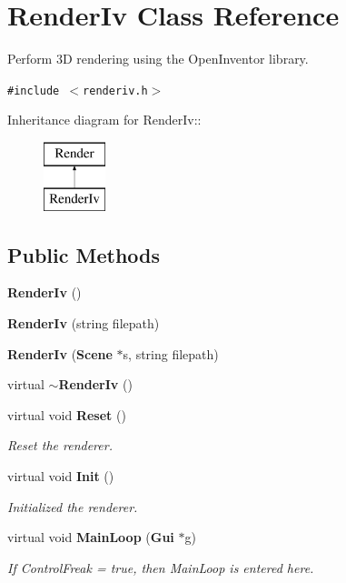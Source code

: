 \section{Render\-Iv  Class Reference}
\label{classRenderIv}
Perform 3D rendering using the Open\-Inventor library. 


{\tt \#include $<$renderiv.h$>$}

Inheritance diagram for Render\-Iv::\begin{figure}[H]
\begin{center}
\leavevmode
\includegraphics[height=2cm]{classRenderIv}
\end{center}
\end{figure}
\subsection*{Public Methods}
\begin{CompactItemize}
\item 
{\bf Render\-Iv} ()
\item 
{\bf Render\-Iv} (string filepath)
\item 
{\bf Render\-Iv} ({\bf Scene} $\ast$s, string filepath)
\item 
virtual {\bf $\sim$Render\-Iv} ()
\item 
virtual void {\bf Reset} ()
\begin{CompactList}\small\item\em Reset the renderer.\item\end{CompactList}\item 
virtual void {\bf Init} ()
\begin{CompactList}\small\item\em Initialized the renderer.\item\end{CompactList}\item 
virtual void {\bf Main\-Loop} ({\bf Gui} $\ast$g)
\begin{CompactList}\small\item\em If Control\-Freak = true, then Main\-Loop is entered here.\item\end{CompactList}\end{CompactItemize}
